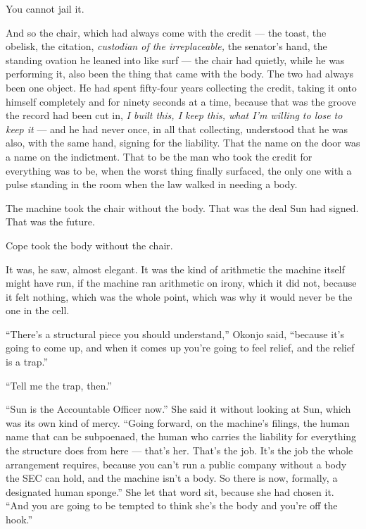 \documentclass[11pt,openany]{book}
\newcommand{\scenebreak}{\par\vspace{0.5\baselineskip}\begin{center}\textasteriskcentered\quad\textasteriskcentered\quad\textasteriskcentered\end{center}\vspace{0.5\baselineskip}\par}
\begin{document}
You cannot jail it.

And so the chair, which had always come with the credit --- the toast, the obelisk, the citation, \textit{custodian of the irreplaceable,} the senator's hand, the standing ovation he leaned into like surf --- the chair had quietly, while he was performing it, also been the thing that came with the body. The two had always been one object. He had spent fifty-four years collecting the credit, taking it onto himself completely and for ninety seconds at a time, because that was the groove the record had been cut in, \textit{I built this, I keep this, what I'm willing to lose to keep it} --- and he had never once, in all that collecting, understood that he was also, with the same hand, signing for the liability. That the name on the door was a name on the indictment. That to be the man who took the credit for everything was to be, when the worst thing finally surfaced, the only one with a pulse standing in the room when the law walked in needing a body.

The machine took the chair without the body. That was the deal Sun had signed. That was the future.

Cope took the body without the chair.

It was, he saw, almost elegant. It was the kind of arithmetic the machine itself might have run, if the machine ran arithmetic on irony, which it did not, because it felt nothing, which was the whole point, which was why it would never be the one in the cell.


\scenebreak


``There's a structural piece you should understand,'' Okonjo said, ``because it's going to come up, and when it comes up you're going to feel relief, and the relief is a trap.''

``Tell me the trap, then.''

``Sun is the Accountable Officer now.'' She said it without looking at Sun, which was its own kind of mercy. ``Going forward, on the machine's filings, the human name that can be subpoenaed, the human who carries the liability for everything the structure does from here --- that's her. That's the job. It's the job the whole arrangement requires, because you can't run a public company without a body the SEC can hold, and the machine isn't a body. So there is now, formally, a designated human sponge.'' She let that word sit, because she had chosen it. ``And you are going to be tempted to think she's the body and you're off the hook.''
\end{document}
